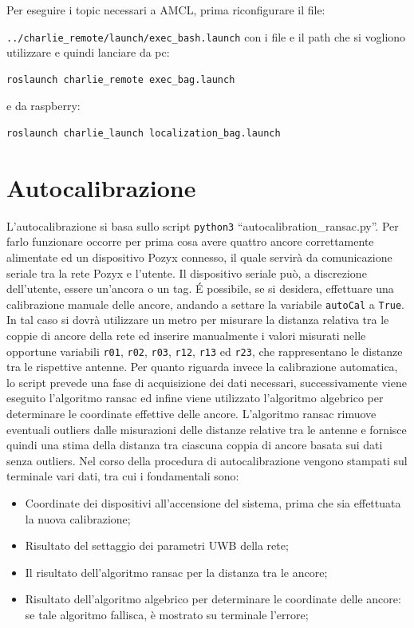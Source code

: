 Per eseguire i topic necessari a AMCL, prima riconfigurare il file:

\verb|../charlie_remote/launch/exec_bash.launch| con i file e il path che si vogliono utilizzare e quindi lanciare da pc:
\begin{lstlisting}[style=bashPC]
	roslaunch charlie_remote exec_bag.launch
\end{lstlisting}
e da raspberry:
\begin{lstlisting}[style=bash]
	roslaunch charlie_launch localization_bag.launch
\end{lstlisting}

\newpage
\appendix
\section{Autocalibrazione}
L'autocalibrazione si basa sullo script \texttt{python3} ``autocalibration\_ransac.py''. 
Per farlo funzionare occorre per prima cosa avere quattro ancore correttamente alimentate ed un dispositivo Pozyx connesso, il quale servirà da comunicazione seriale tra la rete Pozyx e l’utente. 
Il dispositivo seriale può, a discrezione dell’utente, essere un’ancora o un tag. 
É possibile, se si desidera, effettuare una calibrazione manuale delle ancore, andando a settare la variabile \verb|autoCal| a \verb|True|. 
In tal caso si dovrà utilizzare un metro per misurare la distanza relativa tra le coppie di ancore della rete ed inserire manualmente i valori misurati nelle opportune variabili \texttt{r01}, \texttt{r02}, \texttt{r03}, \texttt{r12}, \texttt{r13} ed \texttt{r23}, che rappresentano le distanze tra le rispettive antenne.
Per quanto riguarda invece la calibrazione automatica, lo script prevede una fase di acquisizione dei dati necessari, successivamente viene eseguito l’algoritmo ransac ed infine viene utilizzato l’algoritmo algebrico per determinare le coordinate effettive delle ancore. 
L’algoritmo ransac rimuove eventuali outliers dalle misurazioni delle distanze relative tra le antenne e fornisce quindi una stima della distanza tra ciascuna coppia di ancore basata sui dati senza outliers.
Nel corso della procedura di autocalibrazione vengono stampati sul terminale vari dati, tra cui i fondamentali sono:
\begin{itemize}
	\item Coordinate dei dispositivi all’accensione del sistema, prima che sia effettuata la nuova calibrazione;
	
	\item Risultato del settaggio dei parametri UWB della rete;
	
	\item Il risultato dell’algoritmo ransac per la distanza tra le ancore;
	
	\item Risultato dell'algoritmo algebrico per determinare le coordinate delle ancore: se tale algoritmo fallisca, \`e mostrato su terminale l'errore;
\end{itemize}



\newpage



